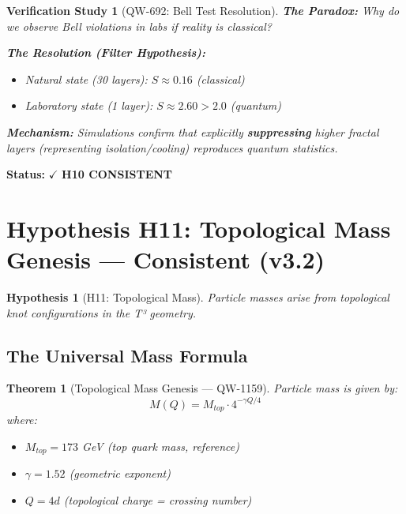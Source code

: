 \documentclass[11pt,a4paper]{book}
\newtheorem{theorem}{Theorem}[section]
\newtheorem{hypothesis}{Hypothesis}[section]
\newtheorem{verification}{Verification Study}[section]
\theoremstyle{remark}
\begin{document}
\begin{verification}[QW-692: Bell Test Resolution]
\textbf{The Paradox:} Why do we observe Bell violations in labs if reality is classical?

\textbf{The Resolution (Filter Hypothesis):}
\begin{itemize}
    \item Natural state (30 layers): $S \approx 0.16$ (classical)
    \item Laboratory state (1 layer): $S \approx 2.60 > 2.0$ (quantum)
\end{itemize}

\textbf{Mechanism:} Simulations confirm that explicitly \textbf{suppressing} higher fractal layers (representing isolation/cooling) reproduces quantum statistics.
\end{verification}

\textbf{Status:} $\checkmark$ \textbf{H10 CONSISTENT}

\section{Hypothesis H11: Topological Mass Genesis --- Consistent (v3.2)}

\begin{hypothesis}[H11: Topological Mass]
Particle masses arise from topological knot configurations in the T³ geometry.
\end{hypothesis}

\subsection{The Universal Mass Formula}

\begin{theorem}[Topological Mass Genesis --- QW-1159]
Particle mass is given by:
\begin{equation}
\boxed{M(Q) = M_{top} \cdot 4^{-\gamma Q/4}}
\end{equation}
where:
\begin{itemize}
    \item $M_{top} = 173$ GeV (top quark mass, reference)
    \item $\gamma = 1.52$ (geometric exponent)
    \item $Q = 4d$ (topological charge = crossing number)
\end{itemize}
\end{theorem}
\end{document}
